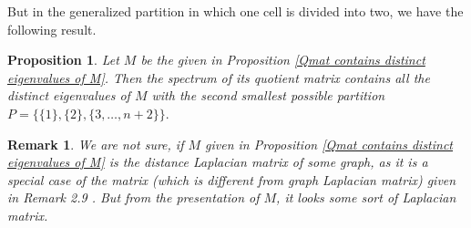 \documentclass[12pt,twoside]{article}
\newtheorem{remark}[theorem]{Remark}
\newtheorem{proposition}[theorem]{Proposition}
\begin{document}
But in the generalized partition in which one cell is divided into two, we have the following result.
\begin{proposition}
	Let $M$ be the given in Proposition \ref{Qmat contains distinct eigenvalues of M}. Then the spectrum of its quotient matrix contains all the distinct eigenvalues of $M$ with the second smallest possible partition $P=\{\{1\},\{2\},\{3,\dots,n+2\}\}.$
\end{proposition}

\begin{remark}
	We are not sure, if $M$ given in Proposition \ref{Qmat contains distinct eigenvalues of M} is the distance Laplacian matrix of some graph, as it is a special case of the matrix (which is different from graph Laplacian matrix) given in Remark 2.9 \cite{bilalijpam}. But from the presentation of $M$, it looks some sort of Laplacian matrix.
\end{remark}
\end{document}
